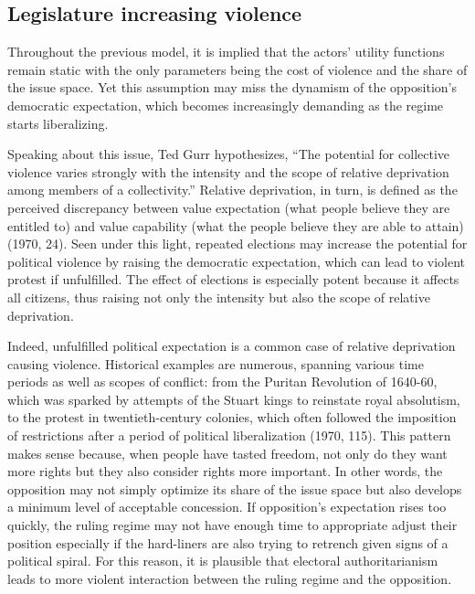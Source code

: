 \subsection{Legislature increasing violence}
Throughout the previous model, it is implied that the actors’ utility functions remain static with the only parameters being the cost of violence and the share of the issue space. Yet this assumption may miss the dynamism of the opposition’s democratic expectation, which becomes increasingly demanding as the regime starts liberalizing.

Speaking about this issue, Ted Gurr hypothesizes, “The potential for collective violence varies strongly with the intensity and the scope of relative deprivation among members of a collectivity.” Relative deprivation, in turn, is defined as the perceived discrepancy between value expectation (what people believe they are entitled to) and value capability (what the people believe they are able to attain) (1970, 24). Seen under this light, repeated elections may increase the potential for political violence by raising the democratic expectation, which can lead to violent protest if unfulfilled. The effect of elections is especially potent because it affects all citizens, thus raising not only the intensity but also the scope of relative deprivation.

Indeed, unfulfilled political expectation is a common case of relative deprivation causing violence. Historical examples are numerous, spanning various time periods as well as scopes of conflict: from the Puritan Revolution of 1640-60, which was sparked by attempts of the Stuart kings to reinstate royal absolutism, to the protest in twentieth-century colonies, which often followed the imposition of restrictions after a period of political liberalization (1970, 115). This pattern makes sense because, when people have tasted freedom, not only do they want more rights but they also consider rights more important. In other words, the opposition may not simply optimize its share of the issue space but also develops a minimum level of acceptable concession. If opposition’s expectation rises too quickly, the ruling regime may not have enough time to appropriate adjust their position especially if the hard-liners are also trying to retrench given signs of a political spiral. For this reason, it is plausible that electoral authoritarianism leads to more violent interaction between the ruling regime and the opposition.